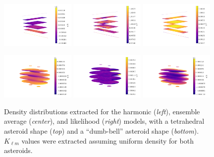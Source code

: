 \documentclass{aastex631}
\begin{document}
\begin{figure}
  \centering
  \includegraphics[width=0.32\textwidth]{harmonic-tet.pdf}
  \includegraphics[width=0.32\textwidth]{ensemble-tet.pdf}
  \includegraphics[width=0.32\textwidth]{likelihood-tet.pdf}

  \includegraphics[width=0.32\textwidth]{harmonic-dumb-bell.pdf}
  \includegraphics[width=0.32\textwidth]{ensemble-dumb-bell.pdf}
  \includegraphics[width=0.32\textwidth]{likelihood-dumb-bell.pdf}
  \caption{Density distributions extracted for the harmonic (\textit{left}), ensemble average (\textit{center}), and likelihood (\textit{right}) models, with a tetrahedral asteroid shape (\textit{top}) and a ``dumb-bell'' asteroid shape (\textit{bottom}). $K_{\ell m}$ values were extracted assuming uniform density for both asteroids.}
  \label{fig:tet-and-db}
\end{figure}
\end{document}
